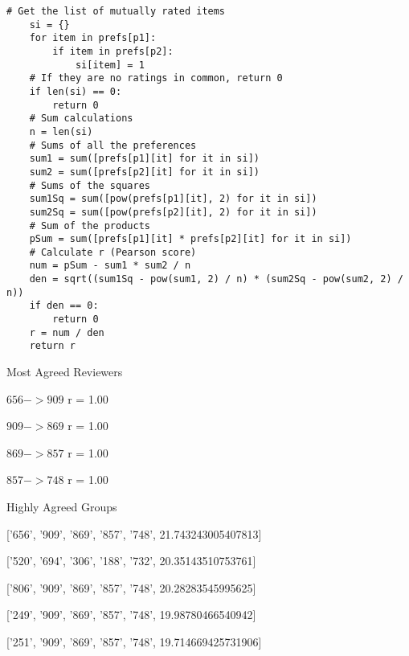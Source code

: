\begin{flushleft}
\begin{lstlisting}[caption={Correlation between two reviewers}]
    # Get the list of mutually rated items
    si = {}
    for item in prefs[p1]:
        if item in prefs[p2]:
            si[item] = 1
    # If they are no ratings in common, return 0
    if len(si) == 0:
        return 0
    # Sum calculations
    n = len(si)
    # Sums of all the preferences
    sum1 = sum([prefs[p1][it] for it in si])
    sum2 = sum([prefs[p2][it] for it in si])
    # Sums of the squares
    sum1Sq = sum([pow(prefs[p1][it], 2) for it in si])
    sum2Sq = sum([pow(prefs[p2][it], 2) for it in si])
    # Sum of the products
    pSum = sum([prefs[p1][it] * prefs[p2][it] for it in si])
    # Calculate r (Pearson score)
    num = pSum - sum1 * sum2 / n
    den = sqrt((sum1Sq - pow(sum1, 2) / n) * (sum2Sq - pow(sum2, 2) / n))
    if den == 0:
        return 0
    r = num / den
    return r
\end{lstlisting}

\begin{center}
Most Agreed Reviewers


$656 -> 909$ r =  1.00

$909 -> 869 $ r = 1.00

$869 -> 857$ r = 1.00

$857 -> 748$ r = 1.00

\vspace{10pt}

Highly Agreed Groups

['656', '909', '869', '857', '748', 21.743243005407813]

['520', '694', '306', '188', '732', 20.35143510753761]

['806', '909', '869', '857', '748', 20.28283545995625]

['249', '909', '869', '857', '748', 19.98780466540942]

['251', '909', '869', '857', '748', 19.714669425731906]



\end{center}


\end{flushleft}





